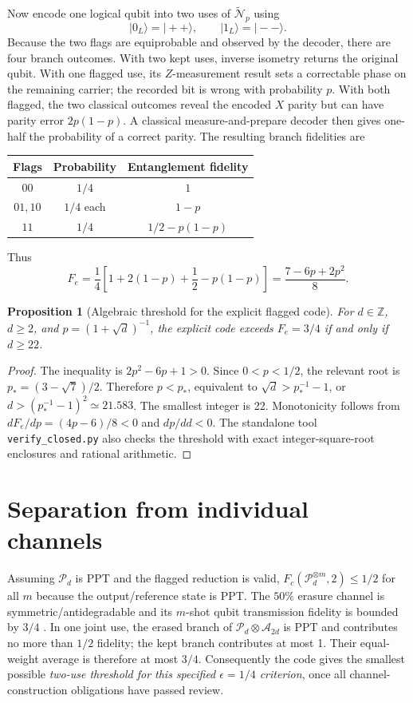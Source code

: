 \documentclass[11pt]{article}
\newtheorem{proposition}{Proposition}
\begin{document}
Now encode one logical qubit into two uses of $\widetilde{\mathcal N}_p$ using
\begin{equation}
|0_L\rangle=|++\rangle,\qquad |1_L\rangle=|--\rangle.
\end{equation}
Because the two flags are equiprobable and observed by the decoder, there are four branch outcomes. With two kept uses, inverse isometry returns the original qubit. With one flagged use, its $Z$-measurement result sets a correctable phase on the remaining carrier; the recorded bit is wrong with probability $p$. With both flagged, the two classical outcomes reveal the encoded $X$ parity but can have parity error $2p(1-p)$. A classical measure-and-prepare decoder then gives one-half the probability of a correct parity. The resulting branch fidelities are
\begin{center}
\begin{tabular}{c c c}\toprule Flags & Probability & Entanglement fidelity\\\midrule
$00$&$1/4$&$1$\\
$01,10$&$1/4$ each&$1-p$\\
$11$&$1/4$&$1/2-p(1-p)$\\\bottomrule\end{tabular}
\end{center}
Thus
\begin{equation}
F_e=\frac14\left[1+2(1-p)+\frac12-p(1-p)\right]=\boxed{\frac{7-6p+2p^2}{8}}.
\end{equation}

\begin{proposition}[Algebraic threshold for the explicit flagged code]
For $d\in\mathbb Z$, $d\geq2$, and $p=(1+\sqrt d)^{-1}$, the explicit code exceeds $F_e=3/4$ if and only if $d\geq22$.
\end{proposition}
\begin{proof}
The inequality is $2p^2-6p+1>0$. Since $0<p<1/2$, the relevant root is $p_*=(3-\sqrt7)/2$. Therefore $p<p_*$, equivalent to $\sqrt d>p_*^{-1}-1$, or $d>(p_*^{-1}-1)^2\simeq21.583$. The smallest integer is 22. Monotonicity follows from $dF_e/dp=(4p-6)/8<0$ and $dp/dd<0$. The standalone tool \texttt{verify\_closed.py} also checks the threshold with exact integer-square-root enclosures and rational arithmetic.
\end{proof}

\section{Separation from individual channels}
Assuming $\mathcal P_d$ is PPT and the flagged reduction is valid, $F_c(\mathcal P_d^{\otimes m},2)\leq1/2$ for all $m$ because the output/reference state is PPT. The $50\%$ erasure channel is symmetric/antidegradable and its $m$-shot qubit transmission fidelity is bounded by $3/4$ \cite{parentin}. In one joint use, the erased branch of $\mathcal P_d\otimes\mathcal A_{2d}$ is PPT and contributes no more than $1/2$ fidelity; the kept branch contributes at most 1. Their equal-weight average is therefore at most $3/4$. Consequently the code gives the smallest possible \emph{two-use threshold for this specified $\epsilon=1/4$ criterion}, once all channel-construction obligations have passed review.
\end{document}
